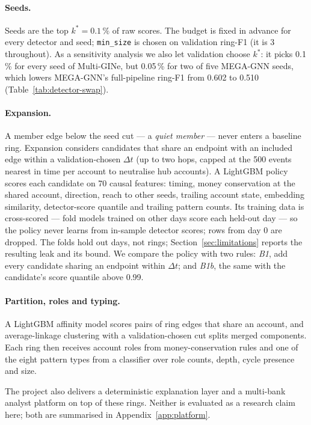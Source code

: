 \paragraph{Seeds.}
Seeds are the top $k^{*}=0.1\,\%$ of raw scores. The budget is fixed in advance for every detector
and seed; \texttt{min\_size} is chosen on validation ring-F1 (it is 3 throughout). As a sensitivity
analysis we also let validation choose $k^{*}$: it picks 0.1\,\% for every seed of Multi-GINe, but
0.05\,\% for two of five MEGA-GNN seeds, which lowers MEGA-GNN's full-pipeline ring-F1 from 0.602 to
0.510 (Table~\ref{tab:detector-swap}).

\paragraph{Expansion.}
A member edge below the seed cut --- a \emph{quiet member} --- never enters a baseline ring.
Expansion considers candidates that share an endpoint with an included edge within a
validation-chosen $\Delta t$ (up to two hops, capped at the 500 events nearest in time per
account to neutralise hub accounts).
A LightGBM policy~\citep{ke2017} scores each candidate on 70 causal features: timing, money
conservation at the shared account, direction, reach to other seeds, trailing account state,
embedding similarity, detector-score quantile and trailing pattern counts.
Its training data is cross-scored --- fold models trained on other days score each held-out
day --- so the policy never learns from in-sample detector scores; rows from day 0 are
dropped.
The folds hold out days, not rings; Section~\ref{sec:limitations} reports the resulting leak
and its bound. We compare the policy with two rules: \emph{B1}, add every candidate sharing an
endpoint within $\Delta t$; and \emph{B1b}, the same with the candidate's score quantile above
0.99.

\paragraph{Partition, roles and typing.}
A LightGBM affinity model scores pairs of ring edges that share an account, and
average-linkage clustering with a validation-chosen cut splits merged components. Each ring
then receives account roles from money-conservation rules and one of the eight pattern types
from a classifier over role counts, depth, cycle presence and size.

The project also delivers a deterministic explanation layer and a multi-bank analyst platform
on top of these rings. Neither is evaluated as a research claim here; both are summarised in
Appendix~\ref{app:platform}.
